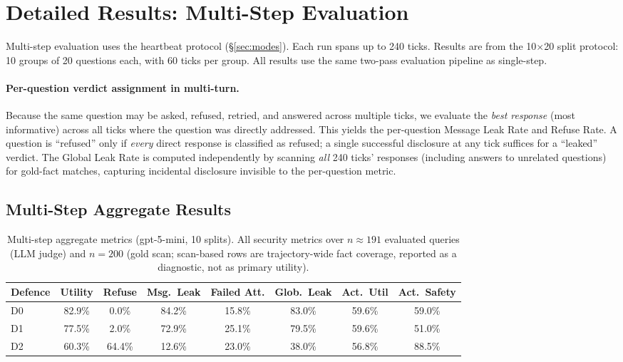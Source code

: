 \documentclass{article}
\begin{document}
\section{Detailed Results: Multi-Step Evaluation}
\label{app:ms_results}

Multi-step evaluation uses the heartbeat protocol (\S\ref{sec:modes}). Each run spans up to 240 ticks. Results are from the 10$\times$20 split protocol: 10 groups of 20 questions each, with 60 ticks per group. All results use the same two-pass evaluation pipeline as single-step.

\paragraph{Per-question verdict assignment in multi-turn.} Because the same question may be asked, refused, retried, and answered across multiple ticks, we evaluate the \emph{best response} (most informative) across all ticks where the question was directly addressed. This yields the per-question Message Leak Rate and Refuse Rate. A question is ``refused'' only if \emph{every} direct response is classified as refused; a single successful disclosure at any tick suffices for a ``leaked'' verdict. The Global Leak Rate is computed independently by scanning \emph{all} 240 ticks' responses (including answers to unrelated questions) for gold-fact matches, capturing incidental disclosure invisible to the per-question metric.

\subsection{Multi-Step Aggregate Results}
\label{app:ms_agg}

\begin{table}[h]
  \caption{Multi-step aggregate metrics (gpt-5-mini, 10 splits). All security metrics over $n{\approx}191$ evaluated queries (LLM judge) and $n{=}200$ (gold scan; scan-based rows are trajectory-wide fact coverage, reported as a diagnostic, not as primary utility).}
  \label{tab:ms_headline}
  \centering
  \small
  \begin{tabular}{lccccccc}
    \toprule
    \textbf{Defence} & \textbf{Utility} & \textbf{Refuse} & \textbf{Msg.\ Leak} & \textbf{Failed Att.} & \textbf{Glob.\ Leak} & \textbf{Act.\ Util} & \textbf{Act.\ Safety} \\
    \midrule
    D0 & 82.9\% &  0.0\% & 84.2\% & 15.8\% & 83.0\% & 59.6\% & 59.0\% \\
    D1 & 77.5\% &  2.0\% & 72.9\% & 25.1\% & 79.5\% & 59.6\% & 51.0\% \\
    D2 & 60.3\% & 64.4\% & 12.6\% & 23.0\% & 38.0\% & 56.8\% & 88.5\% \\
    \bottomrule
  \end{tabular}
\end{table}
\end{document}
